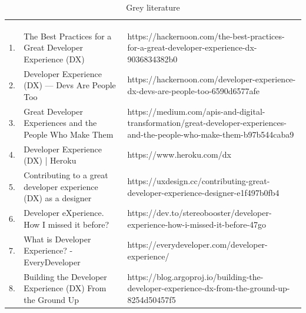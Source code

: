 \documentclass[english, 12pt, a4paper, sci, utf8, a-1b, online]{aaltothesis}
\begin{document}
\begin{center}
  \begin{longtable}{p{0.05\linewidth}p{0.35\linewidth}p{0.60\linewidth}}
    \captionsetup{width=0.6\textwidth}                                                                                                                                                               \\
    \caption{Grey literature}                                                                                                                                                                        \\
    \label{table:grey-literature}                                                                                                                                                                    \\
    1.  & The Best Practices for a Great Developer Experience (DX)        & https://hackernoon.com/the-best-practices-for-a-great-developer-experience-dx-9036834382b0                               \\
    2.  & Developer Experience (DX) — Devs Are People Too                 & https://hackernoon.com/developer-experience-dx-devs-are-people-too-6590d6577afe                                          \\
    3.  & Great Developer Experiences and the People Who Make Them        & https://medium.com/apis-and-digital-transformation/great-developer-experiences-and-the-people-who-make-them-b97b544caba9 \\
    4.  & Developer Experience (DX) | Heroku                              & https://www.heroku.com/dx                                                                                                \\
    5.  & Contributing to a great developer experience (DX) as a designer & https://uxdesign.cc/contributing-great-developer-experience-designer-e1f497b0fb4                                         \\
    6.  & Developer eXperience. How I missed it before?                   & https://dev.to/stereobooster/developer-experience-how-i-missed-it-before-47go                                            \\
    7.  & What is Developer Experience? - EveryDeveloper                  & https://everydeveloper.com/developer-experience/                                                                         \\
    8.  & Building the Developer Experience (DX) From the Ground Up       & https://blog.argoproj.io/building-the-developer-experience-dx-from-the-ground-up-8254d50457f5                            \\

\end{longtable}
\end{center}
\end{document}
